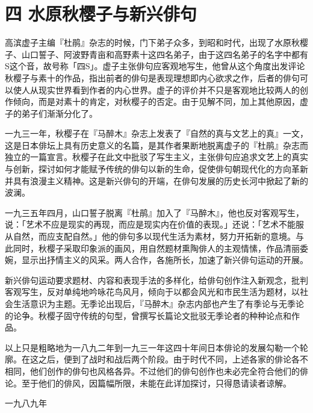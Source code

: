 \section*{\FS 四 水原秋樱子与新兴俳句}

{\FS
    高滨虚子主编『杜鹃』杂志的时候，门下弟子众多，到昭和时代，出现了水原秋樱子、山口誓子、阿波野青亩和高野素十这四名弟子，由于这四名弟子的名字中都有S这个音，故号称「四S」。虚子主张俳句应客观地写生，他曾从这个角度出发评论秋樱子与素十的作品，指出前者的俳句是表现理想即内心欲求之作，后者的俳句可以使人从现实世界看到作者的内心世界。虚子的评价并不只是客观地比较两人的创作倾向，而是对素十的肯定，对秋樱子的否定。由于见解不同，加上其他原因，虚子的弟子们渐渐分化了。

    一九三一年，秋樱子在『马醉木』杂志上发表了『自然的真与文艺上的真』一文，这是日本俳坛上具有历史意义的名篇，是其作者果断地脱离虚子的『杜鹃』杂志而独立的一篇宣言。秋樱子在此文中批驳了写生主义，主张俳句应追求文艺上的真实与创新，探讨如何才能赋予传统的俳句以新的生命，促使俳句朝现代化的方向革新并具有浪漫主义精神。这是新兴俳句的开端，在俳句发展的历史长河中掀起了新的波澜。

    一九三五年四月，山口誓子脱离『杜鹃』加入了『马醉木』，他也反对客观写生，说：「艺术不应是现实的再现，而应是现实内在价值的表现。」还说：「艺术不能服从自然，而应支配自然。」他的俳句多以现代生活为素材，努力开拓新的意境。与此同时，秋樱子采取印象派的画风，用自然题材熏陶俳人的主观情愫，作品清丽委婉，显示出抒情主义的风采。两人合作，各施所长，加速了新兴俳句运动的开展。

    新兴俳句运动要求题材、内容和表现手法的多样化，给俳句创作注入新观念，批判客观写生，反对单纯地吟咏花鸟风月，倾向于以都会风光和市民生活为题材，以社会生活意识为主题。无季论出现后，『马醉木』杂志内部也产生了有季论与无季论的论争。秋樱子固守传统的句型，曾撰写长篇论文批驳无季论者的种种论点和作品。

    以上只是粗略地为一八九二年到一九三一年这四十年间日本俳论的发展勾勒一个轮廓。在这之后，便到了战时和战后两个阶段。由于时代不同，上述各家的俳论各不相同，他们创作的俳句也风格各异。不过他们的俳句创作也未必完全符合他们的俳论。至于他们的俳风，因篇幅所限，未能在此详加探讨，只得恳请读者谅解。

    \hfill 一九八九年
}
